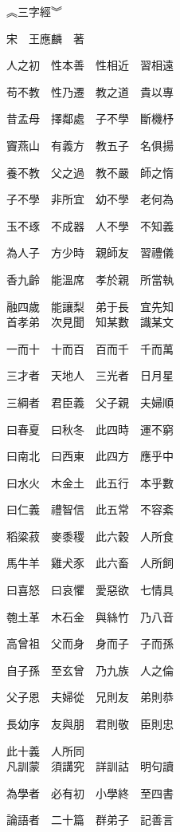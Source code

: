 \documentclass[a4paper,twocolumn]{article}
\begin{document}
\begin{Huge}
︽三字經︾
\\[0.8cm]
\end{Huge}
\begin{huge}
宋　王應麟　著
\\

\end{huge}
\begin{Large}
人之初　性本善　性相近　習相遠

苟不教　性乃遷　教之道　貴以專

昔孟母　擇鄰處　子不學　斷機杼

竇燕山　有義方　教五子　名俱揚

養不教　父之過　教不嚴　師之惰

子不學　非所宜　幼不學　老何為

玉不琢　不成器　人不學　不知義

為人子　方少時　親師友　習禮儀

香九齡　能溫席　孝於親　所當執

融四歲　能讓梨　弟于長　宜先知
\\

首孝弟　次見聞　知某數　識某文

一而十　十而百　百而千　千而萬

三才者　天地人　三光者　日月星

三綱者　君臣義　父子親　夫婦順

曰春夏　曰秋冬　此四時　運不窮

曰南北　曰西東　此四方　應乎中

曰水火　木金土　此五行　本乎數

曰仁義　禮智信　此五常　不容紊

稻粱菽　麥黍稷　此六穀　人所食

馬牛羊　雞犬豕　此六畜　人所飼

曰喜怒　曰哀懼　愛惡欲　七情具

匏土革　木石金　與絲竹　乃八音

高曾祖　父而身　身而子　子而孫

自子孫　至玄曾　乃九族　人之倫

父子恩　夫婦從　兄則友　弟則恭

長幼序　友與朋　君則敬　臣則忠

此十義　人所同
\\

凡訓蒙　須講究　詳訓詁　明句讀

為學者　必有初　小學終　至四書

論語者　二十篇　群弟子　記善言


\end{Large}
\end{document}
